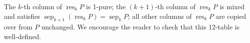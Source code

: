 \documentclass[12pt]{article}
\theoremstyle{plain}
\theoremstyle{definition}
\begin{document}
\begin{itemize}
The $k$-th column of $\operatorname*{res}_{k}P$ is 1-pure; the $\left(  k+1\right)  $-th column of $\operatorname*{res}%
\nolimits_{k}P$ is mixed and satisfies $\operatorname*{sep}\nolimits_{k+1}%
\left(  \operatorname*{res}\nolimits_{k}P\right)  =\operatorname*{sep}%
\nolimits_{k}P$; all other columns of $\operatorname*{res}\nolimits_{k}P$ are
copied over from $P$ unchanged. We encourage the reader to check that
this 12-table is well-defined.



\end{itemize}
\end{document}
